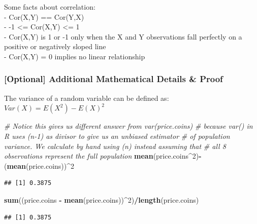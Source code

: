\documentclass[]{article}
\newenvironment{Shaded}{\begin{snugshade}}{\end{snugshade}}
\newcommand{\CommentTok}[1]{\textcolor[rgb]{0.56,0.35,0.01}{\textit{#1}}}
\newcommand{\DecValTok}[1]{\textcolor[rgb]{0.00,0.00,0.81}{#1}}
\newcommand{\KeywordTok}[1]{\textcolor[rgb]{0.13,0.29,0.53}{\textbf{#1}}}
\newcommand{\NormalTok}[1]{#1}
\newcommand{\OperatorTok}[1]{\textcolor[rgb]{0.81,0.36,0.00}{\textbf{#1}}}
\newcommand{\StringTok}[1]{\textcolor[rgb]{0.31,0.60,0.02}{#1}}
\begin{document}
Some facts about correlation:\\
- Cor(X,Y) == Cor(Y,X)\\
- -1 \textless{}= Cor(X,Y) \textless{}= 1\\
- Cor(X,Y) is 1 or -1 only when the X and Y observations fall perfectly
on a positive or negatively sloped line\\
- Cor(X,Y) = 0 implies no linear relationship

\hypertarget{optional-additional-mathematical-details-proof}{%
\subsubsection{{[}Optional{]} Additional Mathematical Details \&
Proof}\label{optional-additional-mathematical-details-proof}}

The variance of a random variable can be defined as:\\
\(Var(X) = E(X^2) - E(X)^2\)

\begin{Shaded}
\begin{Highlighting}[]
\CommentTok{# Notice this gives us different answer from var(price.coins) }
\CommentTok{# because var() in R uses (n-1) as divisor to give us an unbiased estimator}
\CommentTok{# of population variance. We calculate by hand using (n) instead assuming that}
\CommentTok{# all 8 observations represent the full population}
\KeywordTok{mean}\NormalTok{(price.coins}\OperatorTok{^}\DecValTok{2}\NormalTok{)}\OperatorTok{-}
\NormalTok{(}\KeywordTok{mean}\NormalTok{(price.coins))}\OperatorTok{^}\DecValTok{2}
\end{Highlighting}
\end{Shaded}

\begin{verbatim}
## [1] 0.3875
\end{verbatim}

\begin{Shaded}
\begin{Highlighting}[]
\KeywordTok{sum}\NormalTok{((price.coins }\OperatorTok{-}\StringTok{ }\KeywordTok{mean}\NormalTok{(price.coins))}\OperatorTok{^}\DecValTok{2}\NormalTok{)}\OperatorTok{/}\KeywordTok{length}\NormalTok{(price.coins)}
\end{Highlighting}
\end{Shaded}

\begin{verbatim}
## [1] 0.3875
\end{verbatim}
\end{document}
